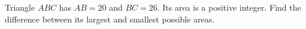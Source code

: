 Triangle $ABC$ has $AB=20$ and $BC=26$. Its area is a positive integer. Find the difference between its largest and smallest possible areas.
